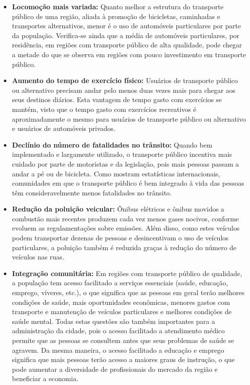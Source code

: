\begin{itemize}
    \item \textbf{Locomoção mais variada:} Quanto melhor a estrutura do transporte público de uma região, aliada à promoção de bicicletas, caminhadas e transportes alternativos, menor é o uso de automóveis particulares por parte da população. Verifica-se ainda que a média de automóveis particulares, por residência, em regiões com transporte público de alta qualidade, pode chegar a metade do que se observa em regiões com pouco investimento em transporte público.
    \item \textbf{Aumento do tempo de exercício físico:} Usuários de transporte público ou alternativo precisam andar pelo menos duas vezes mais para chegar aos seus destinos diários. Esta vantagem de tempo gasto com exercícios se mantém, visto que o tempo gasto com exercícios recreativos é aproximadamente o mesmo para usuários de transporte público ou alternativo e usuários de automóveis privados.
    \item \textbf{Declínio do número de fatalidades no trânsito:} Quando bem implementado e largamente utilizado, o transporte público incentiva mais cuidado por parte de motoristas e da legislação, pois mais pessoas passam a andar a pé ou de bicicleta. Como mostram estatísticas internacionais, comunidades em que o transporte público é bem integrado à vida das pessoas têm consideravelmente menos fatalidades no trânsito.
    \item \textbf{Redução da poluição veicular:} Ônibus elétricos e ônibus movidos a combustão mais recentes produzem cada vez menos gases nocivos, conforme evoluem as regulamentações sobre emissões. Além disso, como estes veículos podem transportar dezenas de pessoas e desincentivam o uso de veículos particulares, a poluição também é reduzida graças à redução do número de veículos nas ruas.
    \item \textbf{Integração comunitária:} Em regiões com transporte público de qualidade, a população tem acesso facilitado a serviços essenciais (saúde, educação, emprego, víveres, etc.), o que significa que as pessoas em geral terão melhores condições de saúde, mais oportunidades econômicas, menores gastos com transporte e manutenção de veículos particulares e melhores condições de saúde mental. Todas estas questões são também importantes para a administração da cidade, pois o acesso facilitado a atendimento médico permite que as pessoas se consultem antes que seus problemas de saúde se agravem. Da mesma maneira, o acesso facilitado a educação e emprego significa que mais pessoas terão acesso a maiores graus de instrução, o que pode aumentar a diversidade de profissionais do mercado da região e beneficiar a economia.
\end{itemize}

